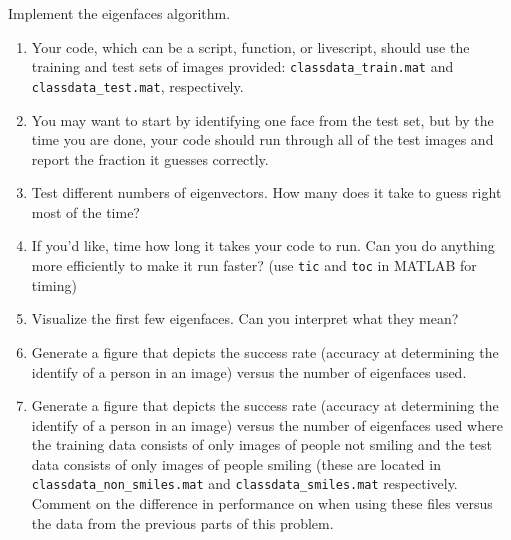 \begin{prob}
Implement the eigenfaces algorithm.%
\begin{enumerate}
\item Your code, which can be a script, function, or livescript, should use the training and test sets of images provided: \texttt{classdata\_train.mat} and \texttt{classdata\_test.mat}, respectively.
\item You may want to start by identifying one face from the test set, but by the time you are done, your code should run through all of the test images and report the fraction it guesses correctly.
\item Test different numbers of eigenvectors. How many does it take to guess right most of the time?
\item If you'd like, time how long it takes your code to run. Can you do anything more efficiently to make it run faster?   (use \texttt{tic} and \texttt{toc} in MATLAB for timing)
\item Visualize the first few eigenfaces.  Can you interpret what they mean?
\item Generate a figure that depicts the success rate (accuracy at determining the identify of a person in an image) versus the number of eigenfaces used.
\item Generate a figure that depicts the success rate (accuracy at determining the identify of a person in an image) versus the number of eigenfaces used where the training data consists of only images of people not smiling and the test data consists of only images of people smiling (these are located in \texttt{classdata\_non\_smiles.mat} and \texttt{classdata\_smiles.mat} respectively.  Comment on the difference in performance on when using these files versus the data from the previous parts of this problem.
\end{enumerate}


\end{prob}
